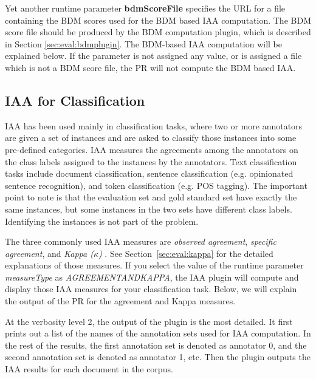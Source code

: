 Yet another runtime parameter {\bf bdmScoreFile} specifies the URL for
a file containing the BDM scores used for the BDM based IAA
computation. The BDM score file should be produced by the BDM
computation plugin, which is described in
Section \ref{sec:eval:bdmplugin}. The BDM-based IAA computation will be
explained below.  If the parameter is not assigned any value, or is
assigned a file which is not a BDM score file, the PR will not compute the
BDM based IAA.

\subsection{IAA for Classification}

IAA has been used mainly in classification tasks, where two or more annotators
are given a set of instances and are asked to classify those instances into some
pre-defined categories. IAA measures the agreements among the annotators on the
class labels assigned to the instances by the annotators. Text classification
tasks include document classification, sentence classification (e.g. opinionated
sentence recognition), and token classification (e.g. POS tagging). The important
point to note is that the evaluation set and gold standard set have exactly the
same instances, but some instances in the two sets have different class labels.
Identifying the instances is not part of the problem.

The three commonly used IAA measures are {\em observed agreement}, {\em specific
agreement}, and {\em Kappa ($\kappa$)} \cite{Hripcsak02}. See
Section~\ref{sec:eval:kappa} for the detailed explanations of those measures. If
you select the value of the runtime parameter {\em measureType} as {\em
AGREEMENTANDKAPPA}, the IAA plugin will compute and display those IAA measures
for your classification task. Below, we will explain the output of the
PR for the agreement and Kappa measures.

At the verbosity level 2, the output of the plugin is the most detailed. It first
prints out a list of the names of the annotation sets used for IAA computation.
In the rest of the results, the first annotation set is denoted as annotator
0, and the second annotation set is denoted as annotator 1, etc.  Then the plugin
outputs the IAA results for each document in the corpus.

